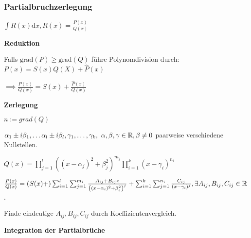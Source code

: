 \subsubsection{Partialbruchzerlegung}
$\int R(x) \mathrm{d}x, R(x) = \frac{P(x)}{Q(x)}$
\begin{compactenum}
    \item \textbf{Reduktion}
        \begin{compactitem}
            \item Falls $\text{grad}(P) \ge \text{grad}(Q)$ führe Polynomdivision durch: $P(x) = S(x)Q(X) + \hat{P}(x)$
            \item $\implies \frac{P(x)}{Q(x)} = S(x) + \frac{\hat{P}(x)}{Q(x)}$
        \end{compactitem}
    \item \textbf{Zerlegung}
        \begin{compactitem}
            \item $n := grad(Q)$
            \item $\alpha_1 \pm i \beta_1, \dots \alpha_l \pm i \beta_l, \gamma_1, \dots , \gamma_k, \ \alpha, \beta, \gamma \in \mathbb{R}, \beta \neq 0$ paarweise verschiedene Nullstellen.
            \item $Q(x) = \prod_{j = 1}^l \left( (x - \alpha_j)^2 + \beta_j^2 \right) ^{m_j} \prod_{i=1}^{k} (x - \gamma_i)^{n_i}$
            \item $\frac{P(x)}{Q(x)} = \left( S(x) + \right) \sum_{i=1}^{l} \sum_{j=1}^{m_i} \frac{A_{ij} + B_{ij} x}{\left( (x - \alpha_i)^2 + \beta_i^2 \right)^j } + \sum_{i=1}^{k} \sum_{j=1}^{n_i} \frac{C_{ij}}{(x - \gamma_i)^j}, \exists A_{ij}, B_{ij}, C_{ij} \in \mathbb{R}$.
            \item Finde eindeutige $A_{ij}, B_{ij}, C_{ij}$ durch Koeffizientenvergleich.
        \end{compactitem}
    \item \textbf{Integration der Partialbrüche}
\end{compactenum}

